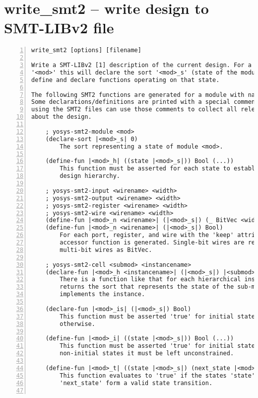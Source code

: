 \section{write\_smt2 -- write design to SMT-LIBv2 file}
\label{cmd:write_smt2}
\begin{lstlisting}[numbers=left,frame=single]
    write_smt2 [options] [filename]

Write a SMT-LIBv2 [1] description of the current design. For a module with name
'<mod>' this will declare the sort '<mod>_s' (state of the module) and will
define and declare functions operating on that state.

The following SMT2 functions are generated for a module with name '<mod>'.
Some declarations/definitions are printed with a special comment. A prover
using the SMT2 files can use those comments to collect all relevant metadata
about the design.

    ; yosys-smt2-module <mod>
    (declare-sort |<mod>_s| 0)
        The sort representing a state of module <mod>.

    (define-fun |<mod>_h| ((state |<mod>_s|)) Bool (...))
        This function must be asserted for each state to establish the
        design hierarchy.

    ; yosys-smt2-input <wirename> <width>
    ; yosys-smt2-output <wirename> <width>
    ; yosys-smt2-register <wirename> <width>
    ; yosys-smt2-wire <wirename> <width>
    (define-fun |<mod>_n <wirename>| (|<mod>_s|) (_ BitVec <width>))
    (define-fun |<mod>_n <wirename>| (|<mod>_s|) Bool)
        For each port, register, and wire with the 'keep' attribute set an
        accessor function is generated. Single-bit wires are returned as Bool,
        multi-bit wires as BitVec.

    ; yosys-smt2-cell <submod> <instancename>
    (declare-fun |<mod>_h <instancename>| (|<mod>_s|) |<submod>_s|)
        There is a function like that for each hierarchical instance. It
        returns the sort that represents the state of the sub-module that
        implements the instance.

    (declare-fun |<mod>_is| (|<mod>_s|) Bool)
        This function must be asserted 'true' for initial states, and 'false'
        otherwise.

    (define-fun |<mod>_i| ((state |<mod>_s|)) Bool (...))
        This function must be asserted 'true' for initial states. For
        non-initial states it must be left unconstrained.

    (define-fun |<mod>_t| ((state |<mod>_s|) (next_state |<mod>_s|)) Bool (...))
        This function evaluates to 'true' if the states 'state' and
        'next_state' form a valid state transition.


\end{lstlisting}
